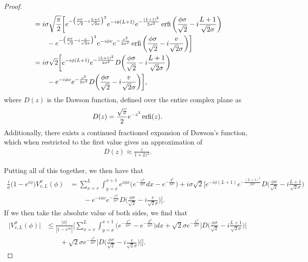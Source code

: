 \documentclass[../thesis-main/thesis-main]{subfiles}
\begin{document}
\begin{proof}
\begin{align}
    &= i\sigma \sqrt{\frac{\pi}{2}} \bigg[ e^{-\big(\frac{\phi \sigma}{\sqrt{2}} - i \frac{L+1}{\sqrt{2}\sigma} \big)^2} e^{- i \phi (L+1)} e^{- \frac{(L+1)^2}{2\sigma^2}} \operatorname{erfi} \bigg(\frac{\phi \sigma}{\sqrt{2}} - i \frac{L+1}{\sqrt{2}\sigma} \bigg)\nonumber\\
    & \qquad -  e^{-\big(\frac{\phi \sigma}{\sqrt{2}} - i \frac{v}{\sqrt{2}\sigma} \big)^2} e^{- i \phi v} e^{- \frac{v^2}{2\sigma^2}} \operatorname{erfi} \bigg(\frac{\phi \sigma}{\sqrt{2}} - i \frac{v}{\sqrt{2}\sigma} \bigg)\bigg]\\
    &= i \sigma \sqrt{2} \bigg[ e^{- i \phi (L+1)} e^{- \frac{(L+1)^2}{2\sigma^2}} D\bigg(\frac{\phi \sigma}{\sqrt{2}} - i \frac{L+1}{\sqrt{2}\sigma} \bigg)\nonumber\\
    &\qquad -  e^{- i \phi v} e^{- \frac{v^2}{2\sigma^2}} D\bigg(\frac{\phi \sigma}{\sqrt{2}} - i \frac{v}{\sqrt{2}\sigma} \bigg)\bigg],
\end{align}
where $D(z)$ is the Dawson function, defined over the entire complex plane as
\begin{align}
  D(z) = \frac{\sqrt{\pi}}{2} e^{-z^2} \operatorname{erfi}(z).
\end{align}
Additionally, there exists a continued fractioned expansion of Dawson's function, which when restricted to the first value gives an approximation of
\begin{align}
  D(z) \approx \frac{z}{1+2z^2}.
\end{align}


Putting all of this together, we then have that
\begin{align}
  \frac{i}{\phi}\big(1 - e^{i \phi}\big) V_{v,L}^{\sigma}(\phi) &= \sum_{x=v}^{L} \int_{y=x}^{x+1} e^{i\phi x}\big(e^{-\frac{x^2}{2\sigma^2}}dx - e^{-\frac{y^2}{2\sigma^2}} \big) + i \sigma \sqrt{2} \bigg[ e^{- i \phi (L+1)} e^{- \frac{(L+1)^2}{2\sigma^2}} D\bigg(\frac{\phi \sigma}{\sqrt{2}} - i \frac{L+1}{\sqrt{2}\sigma} \bigg)\nonumber\\
    &\qquad -  e^{- i \phi v} e^{- \frac{v^2}{2\sigma^2}} D\bigg(\frac{\phi \sigma}{\sqrt{2}} - i \frac{v}{\sqrt{2}\sigma} \bigg)\bigg].
\end{align}
If we then take the absolute value of both sides, we find that
\begin{align}
  \big|V_{v,L}^\sigma(\phi)  \big| & \leq \frac{|\phi|}{|1-e^{i\phi}|} \bigg[\sum_{x=v}^{L} \int_{y=x}^{x+1} \big(e^{-\frac{x^2}{2\sigma^2}} - e^{-\frac{y^2}{2\sigma^2}}\big) dx + \sqrt{2} \sigma e^{-\frac{L^2}{2\sigma^2}} \bigg| D\bigg(\frac{\phi \sigma}{\sqrt{2}} - i \frac{L+1}{\sqrt{2}\sigma} \bigg) \bigg| \nonumber\\
  & \qquad + \sqrt{2} \sigma e^{-\frac{v^2}{2\sigma^2}}  \bigg| D\bigg(\frac{\phi \sigma}{\sqrt{2}} - i \frac{v}{\sqrt{2}\sigma} \bigg) \bigg|\bigg].
\end{align}


\end{proof}
\end{document}
